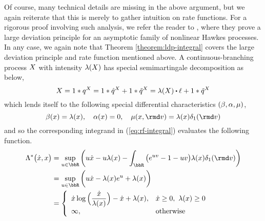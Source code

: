 \begin{example}
  Of course, many technical details are missing in the above argument, but we again reiterate that this is merely to gather intuition on rate functions.
  For a rigorous proof involving such analysis, we refer the reader to \cite{Gao2018b}, where they prove a large deviation principle for an asymptotic family of nonlinear Hawkes processes.
  In any case, we again note that Theorem \ref{theorem:ldp-integral} covers the large deviation principle and rate function mentioned above.
  A continuous-branching process $X$ with intensity $\lambda(X)$ has special semimartingale decomposition as below,
  \begin{equation*}
    \X = 1 \ast \jumpMeas^{\X} = 1 \ast \predproj{\jumpMeas^{\X}} + 1 \ast \compensate{\jumpMeas^{\X}} = \affInt(\X) \shortInt \leb + 1 \ast \compensate{\jumpMeas^{\X}}
  \end{equation*}
  which lends itself to the following special differential characteristics $(\beta, \alpha, \mu)$,
  \begin{equation*}
    \affDrift(\stateVar) = \affInt(\stateVar), \quad
    \affDiff(\stateVar) = 0, \quad
    \affJump(\stateVar, \rmd\markVar) = \affInt(\stateVar) \delta_1(\rmd\markVar)
  \end{equation*}
  and so the corresponding integrand in (\ref{eq:rf-integral}) evaluates the following function.
  \begin{align*}
    \ode^*\big(\diffVar, \stateVar \big) 
    &= \sup_{\momentVar\in\bbR}\bigg( \momentVar \diffVar - \momentVar\affInt(\stateVar) - \int_\bbR \big( e^{\momentVar\markVar} - 1 - \momentVar\markVar \big) \affInt(\stateVar)\delta_1(\rmd\markVar) \bigg) \\
    &= \sup_{\momentVar\in\bbR}\bigg( \momentVar \diffVar - \affInt(\stateVar) e^\momentVar + \affInt(\stateVar) \bigg) \\
    &= \left\{\begin{array}{ll}
      \displaystyle \diffVar \log\Big(\frac{\diffVar}{\affInt(\stateVar)}\Big) - \diffVar + \affInt(\stateVar), & \diffVar \geq 0, ~ \affInt(\stateVar) \geq 0 \\
      \infty, & \text{otherwise}
    \end{array}\right.
  \end{align*}


\end{example}
